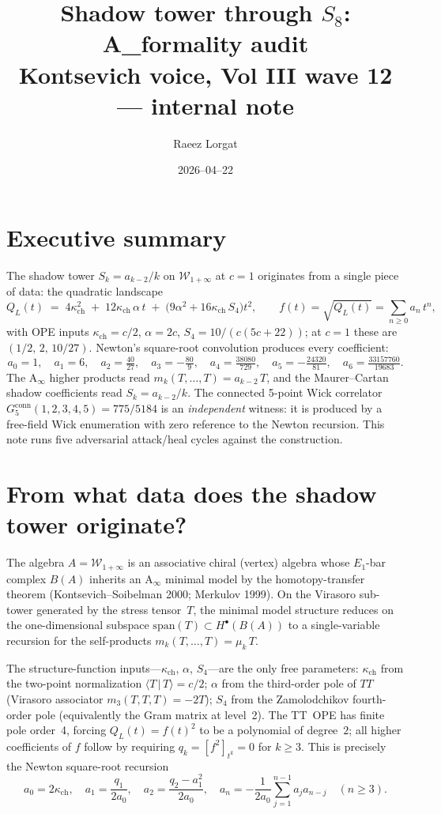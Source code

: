 \documentclass[11pt]{article}
\title{Shadow tower through $S_8$: A_\infty formality audit\\
\normalsize Kontsevich voice, Vol III wave 12 --- internal note}
\author{Raeez Lorgat}
\date{2026--04--22}
\newcommand{\kch}{\kappa_{\mathrm{ch}}}
\newcommand{\Winf}{\mathcal{W}_{1+\infty}}
\newcommand{\conn}{\mathrm{conn}}
\begin{document}
\maketitle

\section{Executive summary}

The shadow tower $S_k = a_{k-2}/k$ on $\Winf$ at $c=1$ originates from a
single piece of data: the quadratic landscape
\[
Q_L(t)\;=\;4\kch^2\;+\;12\kch\,\alpha\,t\;+\;\bigl(9\alpha^2+16\kch\,S_4\bigr)t^2,
\qquad f(t)=\sqrt{Q_L(t)}=\sum_{n\geq 0}a_n\,t^n,
\]
with OPE inputs $\kch=c/2$, $\alpha=2c$, $S_4=10/(c(5c+22))$; at $c=1$
these are $(1/2,\,2,\,10/27)$. Newton's square-root convolution produces
every coefficient:
\[
a_0=1,\quad a_1=6,\quad a_2=\tfrac{40}{27},\quad a_3=-\tfrac{80}{9},
\quad a_4=\tfrac{38080}{729},\quad a_5=-\tfrac{24320}{81},\quad a_6=\tfrac{33157760}{19683}.
\]
The A$_\infty$ higher products read
$m_k(T,\ldots,T)=a_{k-2}\,T$, and the Maurer--Cartan shadow
coefficients read $S_k=a_{k-2}/k$. The connected 5-point Wick
correlator $G_5^{\conn}(1,2,3,4,5)=775/5184$ is an
\emph{independent} witness: it is produced by a free-field
Wick enumeration with zero reference to the Newton recursion. This
note runs five adversarial attack/heal cycles against the construction.

\section{From what data does the shadow tower originate?}

The algebra $A=\Winf$ is an associative chiral (vertex) algebra whose
$E_1$-bar complex $B(A)$ inherits an A$_\infty$ minimal model by the
homotopy-transfer theorem (Kontsevich--Soibelman 2000; Merkulov 1999).
On the Virasoro sub-tower generated by the stress tensor~$T$, the
minimal model structure reduces on the one-dimensional subspace
$\mathrm{span}(T)\subset H^\bullet(B(A))$ to a single-variable
recursion for the self-products
$m_k(T,\ldots,T)=\mu_k\,T$.

The structure-function inputs---$\kch$, $\alpha$, $S_4$---are the
only free parameters: $\kch$ from the two-point normalization
$\langle T\,|\,T\rangle=c/2$; $\alpha$ from the third-order pole of
$TT$ (Virasoro associator $m_3(T,T,T)=-2T$); $S_4$ from the
Zamolodchikov fourth-order pole (equivalently the Gram matrix at
level~2). The TT~OPE has finite pole order~4, forcing
$Q_L(t)=f(t)^2$ to be a polynomial of degree~$2$; all higher
coefficients of $f$ follow by requiring
$q_k=[f^2]_{t^k}=0$ for $k\geq 3$. This is precisely the Newton
square-root recursion
\begin{equation}\label{eq:newton}
a_0=2\kch,\quad a_1=\frac{q_1}{2a_0},\quad
a_2=\frac{q_2-a_1^2}{2a_0},\quad
a_n=-\frac{1}{2a_0}\sum_{j=1}^{n-1}a_j a_{n-j}\quad(n\geq 3).
\end{equation}
\end{document}
